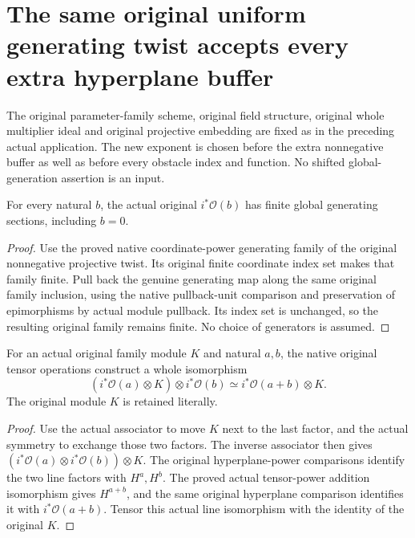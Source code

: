 \section{The same original uniform generating twist accepts every extra hyperplane buffer}

The original parameter-family scheme, original field structure, original
whole multiplier ideal and original projective embedding are fixed as in
the preceding actual application. The new exponent is chosen before the
extra nonnegative buffer as well as before every obstacle index and function.
No shifted global-generation assertion is an input.

\begin{lemma}
\label{lem:c0n-original-nonnegative-buffer-generators}
\leanok
For every natural $b$, the actual original $i^*\mathcal O(b)$ has finite
global generating sections, including $b=0$.
\end{lemma}
\begin{proof}
Use the proved native coordinate-power generating family of the original
nonnegative projective twist. Its original finite coordinate index set
makes that family finite. Pull back the genuine generating map along the
same original family inclusion, using the native pullback-unit comparison
and preservation of epimorphisms by actual module pullback. Its index set
is unchanged, so the resulting original family remains finite. No choice
of generators is assumed.
\end{proof}

\begin{lemma}
\label{lem:c0n-original-buffer-module-iso}
\leanok
For an actual original family module $K$ and natural $a,b$, the native
original tensor operations construct a whole isomorphism
\[
 (i^*\mathcal O(a)\otimes K)\otimes i^*\mathcal O(b)
 \simeq i^*\mathcal O(a+b)\otimes K.
\]
The original module $K$ is retained literally.
\end{lemma}
\begin{proof}
Use the actual associator to move $K$ next to the last factor, and the
actual symmetry to exchange those two factors. The inverse associator
then gives $(i^*\mathcal O(a)\otimes i^*\mathcal O(b))\otimes K$.
The original hyperplane-power comparisons identify the two line factors
with $H^a,H^b$. The proved actual tensor-power addition isomorphism gives
$H^{a+b}$, and the same original hyperplane comparison identifies it with
$i^*\mathcal O(a+b)$. Tensor this actual line isomorphism with the identity
of the original $K$.
\end{proof}

